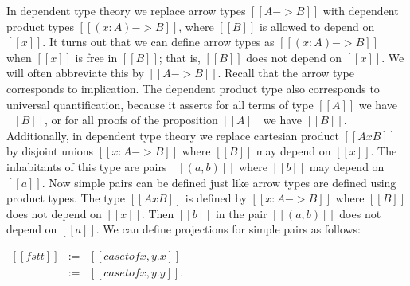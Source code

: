 In dependent type theory we replace arrow types $[[A -> B]]$ with
dependent product types $[[(x : A) -> B]]$, where $[[B]]$ is allowed
to depend on $[[x]]$.  It turns out that we can define arrow types as
$[[(x : A) -> B]]$ when $[[x]]$ is free in $[[B]]$; that is, $[[B]]$
does not depend on $[[x]]$.  We will often abbreviate this by $[[A ->
B]]$.  Recall that the arrow type corresponds to implication.  The
dependent product type also corresponds to universal quantification,
because it asserts for all terms of type $[[A]]$ we have $[[B]]$, or
for all proofs of the proposition $[[A]]$ we have $[[B]]$.
Additionally, in dependent type theory we replace cartesian product
$[[A x B]]$ by disjoint unions $[[{x : A} -> B]]$ where $[[B]]$ may
depend on $[[x]]$.  The inhabitants of this type are pairs $[[(a,b)]]$
where $[[b]]$ may depend on $[[a]]$.  Now simple pairs can be defined
just like arrow types are defined using product types.  The type $[[A
x B]]$ is defined by $[[{x : A} -> B]]$ where $[[B]]$ does not depend
on $[[x]]$.  Then $[[b]]$ in the pair $[[(a,b)]]$ does not depend on
$[[a]]$.  We can define projections for simple pairs as follows:
\begin{center}
  \begin{math}
    \begin{array}{lll}
      [[fst t]] & := & [[case t of x,y.x]]\\
      [[snd t]] & := & [[case t of x,y.y]].
    \end{array}
  \end{math}
\end{center}

